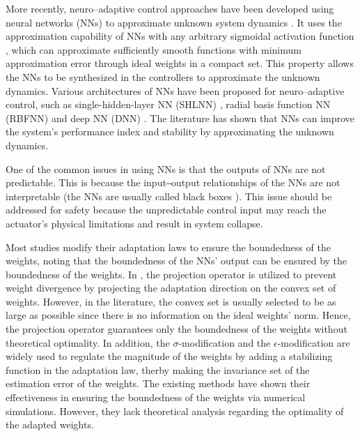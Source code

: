 \documentclass[letterpaper, 10 pt, conference]{ieeeconf}  %
\begin{document}
More recently, neuro–adaptive control approaches have been developed using neural networks (NNs) to approximate unknown system dynamics \cite{Farrell:2006aa}.
It uses the approximation capability of NNs with any arbitrary sigmoidal activation function \cite{Cybenko:1989aa}, which can approximate sufficiently smooth functions with minimum approximation error through ideal weights in a compact set.
This property allows the NNs to be synthesized in the controllers to approximate the unknown dynamics.
Various architectures of NNs have been proposed for neuro–adaptive control, such as single-hidden-layer NN (SHLNN) \cite{Esfandiari:2015aa,Gao:2006aa}, radial basis function NN (RBFNN) \cite{Ge:2002aa,Zhou:2023aa} and deep NN (DNN) \cite{Patil:2022aa}.
The literature has shown that NNs can improve the system's performance index and stability by approximating the unknown dynamics.


One of the common issues in using NNs is that the outputs of NNs are not predictable.
This is because the input‒output relationships of the NNs are not interpretable (\ie the NNs are usually called black boxes \cite{Sheu:2020aa,Rudin:2019aa}).
This issue should be addressed for safety because the unpredictable control input may reach the actuator's physical limitations and result in system collapse.

Most studies modify their adaptation laws to ensure the boundedness of the weights, noting that the boundedness of the NNs' output can be ensured by the boundedness of the weights.
In \cite{Zhou:2023aa,Patil:2022aa}, the projection operator is utilized to prevent weight divergence by projecting the adaptation direction on the convex set of weights.
However, in the literature, the convex set is usually selected to be as large as possible since there is no information on the ideal weights' norm.
Hence, the projection operator guarantees only the boundedness of the weights without theoretical optimality.
In addition, the $\sigma$-modification\cite{Ge:2002aa} and the $\epsilon$-modification \cite{Esfandiari:2015aa,Gao:2006aa} are widely used to regulate the magnitude of the weights by adding a stabilizing function in the adaptation law, therby making the invariance set of the estimation error of the weights. 
The existing methods have shown their effectiveness in ensuring the boundedness of the weights via numerical simulations.
However, they lack theoretical analysis regarding the optimality of the adapted weights.
\end{document}
